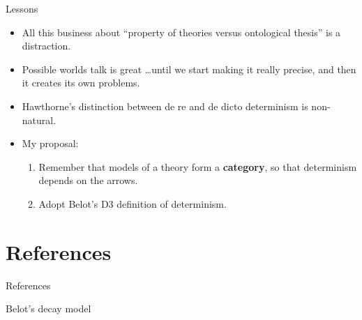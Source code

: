 \documentclass[fleqn]{beamer}
\begin{document}
\begin{frame}{Lessons}

  \begin{itemize}
  \item All this business about ``property of theories versus
    ontological thesis'' is a distraction.
  \item Possible worlds talk is great \dots until we start making it
    really precise, and then it creates its own problems.
  \item Hawthorne's distinction between de re and de dicto determinism
    is non-natural.
  \item My proposal:
    \begin{enumerate}
    \item Remember that models of a theory form a \textbf{category},
      so that determinism depends on the arrows.
    \item Adopt Belot's D3 definition of determinism.
    \end{enumerate}
  \end{itemize}

\end{frame}




\section{References}

\begin{frame}[allowframebreaks]{References}

\printbibliography[heading=none]

\end{frame}


\begin{frame}{Belot's decay model}

\end{frame}
\end{document}
